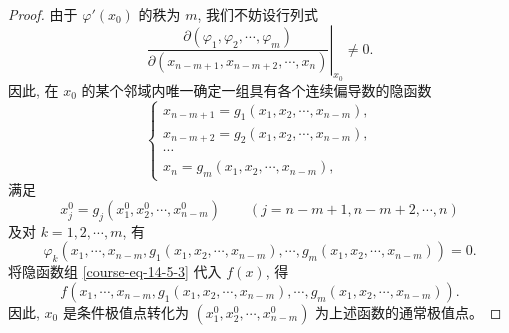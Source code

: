 \documentclass[12pt,fontset=fandol]{ctexart}
\begin{document}
\begin{proof}\quad 由于 $\varphi'(x_0)$ 的秩为 $m$, 我们不妨设行列式
\[
  \left.
  \frac{\partial(\varphi_1,\varphi_2,\cdots,\varphi_m)}
       {\partial(x_{n-m+1},x_{n-m+2},\cdots,x_n)}
  \right|_{x_0}
  \ne0.
\]
因此, 在 $x_0$ 的某个邻域内唯一确定一组具有各个连续偏导数的隐函数
\begin{equation}
  \begin{cases}
    x_{n-m+1}=g_1(x_1,x_2,\cdots,x_{n-m}),\\
    x_{n-m+2}=g_2(x_1,x_2,\cdots,x_{n-m}),\\
    \cdots\\
    x_n=g_m(x_1,x_2,\cdots,x_{n-m}),
  \end{cases}
  \label{course-eq-14-5-3}
\end{equation}
满足
\[
  x_j^0=g_j(x_1^0,x_2^0,\cdots,x_{n-m}^0)
  \qquad (j=n-m+1,n-m+2,\cdots,n)
\]
及对 $k=1,2,\cdots,m$, 有
\[
  \varphi_k(x_1,\cdots,x_{n-m},g_1(x_1,x_2,\cdots,x_{n-m}),\cdots,g_m(x_1,x_2,\cdots,x_{n-m}))=0.
\]
将隐函数组 \eqref{course-eq-14-5-3}  代入 $f(x)$, 得
\[
  f(x_1,\cdots,x_{n-m},g_1(x_1,x_2,\cdots,x_{n-m}),\cdots,g_m(x_1,x_2,\cdots,x_{n-m})).
\]
因此, $x_0$ 是条件极值点转化为 $(x_1^0,x_2^0,\cdots,x_{n-m}^0)$ 为上述函数的通常极值点。


\end{proof}
\end{document}
